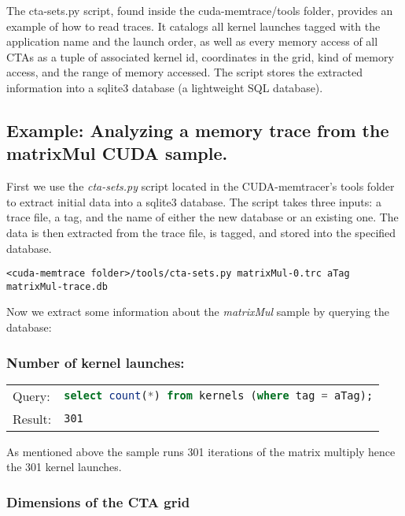 \documentclass{scrartcl}
\begin{document}
The cta-sets.py script, found inside the cuda-memtrace/tools folder, provides an example of how to read traces. It catalogs all kernel launches tagged with the application name and the launch order, as well as every memory access of all CTAs as a tuple of associated kernel id, coordinates in the grid, kind of memory access, and the range of memory accessed.
The script stores the extracted information into a sqlite3 database (a lightweight SQL database).

\newpage

\subsection{Example: Analyzing a memory trace from the matrixMul CUDA sample.}


First we use the \textit{cta-sets.py} script located in the CUDA-memtracer’s tools folder to extract initial data into a sqlite3 database. The script takes three inputs: a trace file, a tag, and the name of either the new database or an existing one. The data is then extracted from the trace file, is tagged, and stored into the specified database.
\begin{lstlisting}
<cuda-memtrace folder>/tools/cta-sets.py matrixMul-0.trc aTag matrixMul-trace.db
\end{lstlisting}

\bigskip

Now we extract some information about the \textit{matrixMul} sample by querying the database:

\subsubsection*{Number of kernel launches:}

\begin{tabularx}{\textwidth}{l X}
Query: & \lstinline[language=sql]{select count(*) from kernels (where tag = aTag);} \\ 
Result: & \lstinline{301}
\end{tabularx}

\smallskip

As mentioned above the sample runs 301 iterations of the matrix multiply hence 
the 301 kernel launches.

\subsubsection*{Dimensions of the CTA grid}
\end{document}
